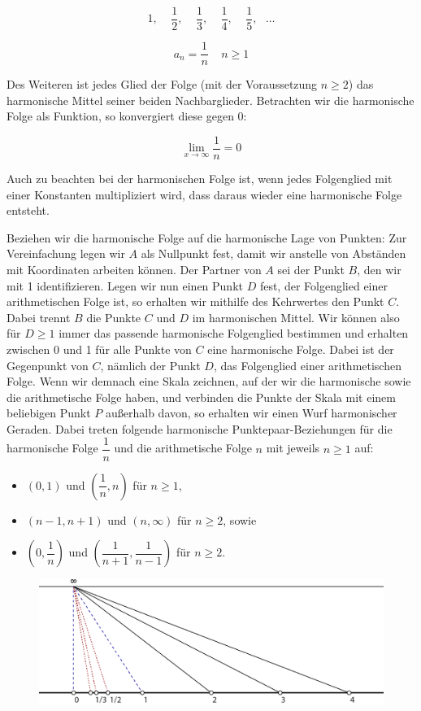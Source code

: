 \documentclass[12pt,a4paper]{article}
\begin{document}
\[ 1,~~~~~\dfrac{1}{2},~~~~~\dfrac{1}{3},~~~~~\dfrac{1}{4},~~~~~\dfrac{1}{5},~~~\dots\]

\[ a_n = \dfrac{1}{n} ~~~~~ n \geq 1\]

Des Weiteren ist jedes Glied der Folge (mit der Voraussetzung $n \geq 2$) das harmonische Mittel seiner beiden Nachbarglieder. Betrachten wir die harmonische Folge als Funktion, so konvergiert diese gegen 0:

\[ \lim_{x \to \infty} \dfrac{1}{n} = 0\]

Auch zu beachten bei der harmonischen Folge ist, wenn jedes Folgenglied mit einer Konstanten multipliziert wird, dass daraus wieder eine harmonische Folge entsteht.

Beziehen wir die harmonische Folge auf die harmonische Lage von Punkten: Zur Vereinfachung legen wir $A$ als Nullpunkt fest, damit wir anstelle von Abständen mit Koordinaten arbeiten können. Der Partner von $A$ sei der Punkt $B$, den wir mit 1 identifizieren. Legen wir nun einen Punkt $D$ fest, der Folgenglied einer arithmetischen Folge ist, so erhalten wir mithilfe des Kehrwertes den Punkt $C$. Dabei trennt $B$ die Punkte $C$ und $D$ im harmonischen Mittel. Wir können also für $D \geq 1$ immer das passende harmonische Folgenglied bestimmen und erhalten zwischen 0 und 1 für alle Punkte von $C$ eine harmonische Folge. Dabei ist der Gegenpunkt von $C$, nämlich der Punkt $D$, das Folgenglied einer arithmetischen Folge. Wenn wir demnach eine Skala zeichnen, auf der wir die harmonische sowie die arithmetische Folge haben, und verbinden die Punkte der Skala mit einem beliebigen Punkt $P$ außerhalb davon, so erhalten wir einen Wurf harmonischer Geraden. Dabei treten folgende harmonische Punktepaar-Beziehungen für die harmonische Folge $\dfrac{1}{n}$ und die arithmetische Folge $n$ mit jeweils $n \geq 1$ auf:

\begin{itemize}
\item $\left(0, 1\right)$ und $\left(\dfrac{1}{n}, n\right)$ für $n \geq 1$,
\item $\left(n-1, n+1\right)$ und $\left(n, \infty\right)$ für $n \geq 2$, sowie
\item $\left(0, \dfrac{1}{n}\right)$ und $\left(\dfrac{1}{n+1}, \dfrac{1}{n-1}\right)$ für $n \geq 2$.
\end{itemize}

\begin{figure}[htbp]
\includegraphics[width=\textwidth]{Bilder/folge.png}
\end{figure}
\end{document}
